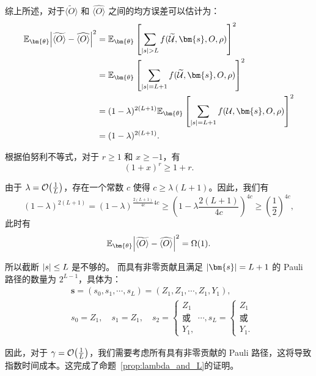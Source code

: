 综上所述，对于$\widetilde{\langle O \rangle}$ 和 $\widehat{\langle O \rangle}$ 之间的均方误差可以估计为： 
\begin{equation} 
    \begin{aligned} 
        \mathbb{E}_{\bm{\theta}}\abs{\widetilde{\langle O \rangle}-\widehat{\langle O \rangle}}^2 &=\mathbb{E}_{\bm{\theta}}\left[\sum_{\abs{s}> L}f(\widetilde{\mathcal{U}},\bm{s},O,\rho)\right]^2\\
         &=\mathbb{E}_{\bm{\theta}}\left[\sum_{\abs{s}=L+1}f(\widetilde{\mathcal{U}},\bm{s},O,\rho)\right]^2\\
        &= (1-\lambda)^{2(L+1)}\mathbb{E}_{\bm{\theta}} \left[\sum_{\abs{s}=L+1}{f}(\mathcal{U},\bm{s},O,\rho)\right]^2\\ 
        &=(1-\lambda)^{2(L+1)}.
    \end{aligned} 
\end{equation}

根据伯努利不等式，对于 $r\geq 1$ 和 $x\geq -1$，有 
\begin{equation} 
    (1+x)^r\geq 1+r. 
\end{equation}

由于 $\lambda=\order{\frac{1}{L}}$，存在一个常数 $c$ 使得 $c\geq \lambda (L+1)$。因此，我们有 \begin{equation} 
    (1-\lambda)^{2(L+1)}= (1-\lambda)^{\frac{2(L+1)}{4c} 4c} \geq \left(1-\lambda \frac{2(L+1)}{4c} \right)^{4c}\geq \left(\frac{1}{2}\right)^{4c}, 
\end{equation} 
此时有
\begin{equation} 
    \mathbb{E}_{\bm{\theta}}\abs{\widetilde{\langle O \rangle}-\widehat{\langle O \rangle}}^2 =\Omega(1). 
\end{equation}

所以截断 $\abs{s}\leq L$ 是不够的。 而具有非零贡献且满足 $\abs{\bm{s}}=L+1$ 的 Pauli 路径的数量为 $2^{L-1}$，具体为：
\begin{equation} 
    \begin{aligned}
        &\bm{s}=(s_0,s_1,\cdots,s_L)=(Z_1,Z_1,\cdots,Z_1,Y_1),\\
        &s_0=Z_1, \quad s_1=Z_1, \quad s_2=\begin{cases}
            Z_1 \\ \text{或}\\
            Y_1,
        \end{cases}
        \cdots, s_L=\begin{cases}
            Z_1 \\ \text{或} \\
            Y_1.
        \end{cases}
    \end{aligned}
\end{equation}

因此，对于 $\gamma=\order{\frac{1}{L}}$，我们需要考虑所有具有非零贡献的 Pauli 路径，这将导致指数时间成本。这完成了命题~\ref{prop:lambda_and_L}的证明。



